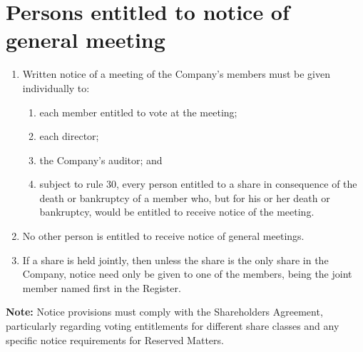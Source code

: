\section{Persons entitled to notice of general meeting}

\begin{enumerate}[label=(\alph*)]
    \item Written notice of a meeting of the Company's members must be given individually to:
    \begin{enumerate}[label=(\roman*)]
        \item each member entitled to vote at the meeting;
        \item each director;
        \item the Company's auditor; and
        \item subject to rule 30, every person entitled to a share in consequence of the death or bankruptcy of a member who, but for his or her death or bankruptcy, would be entitled to receive notice of the meeting.
    \end{enumerate}
    
    \item No other person is entitled to receive notice of general meetings.
    
    \item If a share is held jointly, then unless the share is the only share in the Company, notice need only be given to one of the members, being the joint member named first in the Register.
\end{enumerate}

\textbf{Note:} Notice provisions must comply with the Shareholders Agreement, particularly regarding voting entitlements for different share classes and any specific notice requirements for Reserved Matters. 